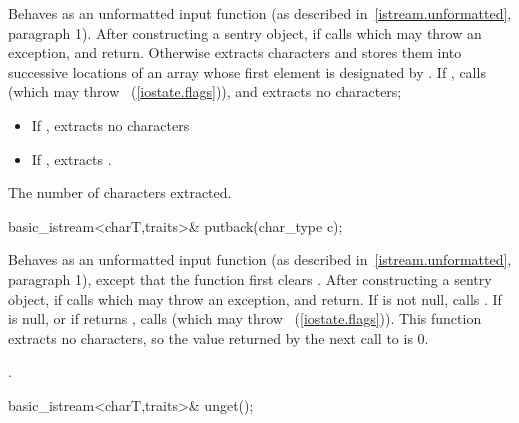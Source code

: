 \begin{itemdescr}
\pnum
\effects
Behaves as an unformatted input function (as described in~\ref{istream.unformatted}, paragraph 1).
After constructing
a sentry object, if
calls
which may throw an exception,
and return.
Otherwise extracts characters and stores them
into successive locations of an array whose first element is designated by
.
If
,
calls
(which may throw
~(\ref{iostate.flags})),
and extracts no characters;
\begin{itemize}
\item
If
,
extracts no characters
\item
If
,
extracts
.
\end{itemize}

\pnum
\returns
The number of characters extracted.
\end{itemdescr}

%
\begin{itemdecl}
basic_istream<charT,traits>& putback(char_type c);
\end{itemdecl}

\begin{itemdescr}
\pnum
\effects
Behaves as an unformatted input function (as described in~\ref{istream.unformatted}, paragraph
1), except that the function first clears .
After constructing
a sentry object, if
calls
which may throw an exception,
and return.
If
is not null, calls
.
If
is null, or if
returns
,
calls
(which may throw
~(\ref{iostate.flags})).
\enternote
This
function extracts no characters, so the value returned by the next call to
is 0.
\exitnote

\pnum
\returns
{}.
\end{itemdescr}

%
\begin{itemdecl}
basic_istream<charT,traits>& unget();
\end{itemdecl}


